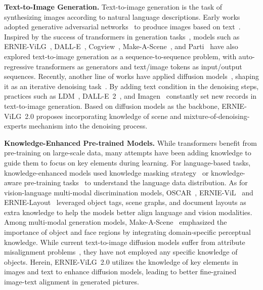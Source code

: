 \documentclass[10pt,twocolumn,letterpaper]{article}
\begin{document}
\noindent\textbf{Text-to-Image Generation.} 
Text-to-image generation is the task of synthesizing images according to natural language descriptions. 
Early works adopted generative adversarial networks~\cite{DBLP:conf/nips/GoodfellowPMXWOCB14} to produce images based on text~\cite{DBLP:conf/cvpr/XuZHZGH018,DBLP:conf/cvpr/ZhuP0019,DBLP:conf/cvpr/Tao00JBX22,DBLP:conf/cvpr/0010KBLY21}.
Inspired by the success of transformers in generation tasks~\cite{DBLP:conf/nips/VaswaniSPUJGKP17}, models such as ERNIE-ViLG~\cite{DBLP:journals/corr/abs-2112-15283}, DALL-E~\cite{DBLP:conf/icml/RameshPGGVRCS21}, Cogview~\cite{DBLP:conf/nips/DingYHZZYLZSYT21}, Make-A-Scene~\cite{DBLP:journals/corr/abs-2203-13131}, and Parti~\cite{DBLP:journals/corr/abs-2206-10789} have also explored text-to-image generation as a sequence-to-sequence problem, with auto-regressive transformers as generators and text/image tokens as input/output sequences.
Recently, another line of works have applied diffusion models~\cite{DBLP:conf/icml/Sohl-DicksteinW15}, shaping it as an iterative denoising task~\cite{DBLP:conf/nips/HoJA20,DBLP:conf/iclr/SongME21,DBLP:conf/iclr/SalimansH22}. 
By adding text condition in the denoising steps, practices such as LDM~\cite{DBLP:journals/corr/abs-2112-10752}, DALL-E~2~\cite{DBLP:journals/corr/abs-2204-06125}, and Imagen~\cite{DBLP:journals/corr/abs-2205-11487} constantly set new records in text-to-image generation.
Based on diffusion models as the backbone, ERNIE-ViLG~2.0 proposes incorporating knowledge of scene and mixture-of-denoising-experts mechanism into the denoising process.


\noindent\textbf{Knowledge-Enhanced Pre-trained Models.}
While transformers benefit from pre-training on large-scale data, many attempts have been adding knowledge to guide them to focus on key elements during learning.
For language-based tasks, knowledge-enhanced models used knowledge masking strategy~\cite{DBLP:journals/corr/abs-1904-09223,DBLP:journals/tacl/JoshiCLWZL20} or knowledge-aware pre-training tasks~\cite{DBLP:conf/aaai/SunWLFTWW20,DBLP:journals/corr/abs-2107-02137} to understand the language data distribution.
As for vision-language multi-modal discrimination models,
OSCAR~\cite{DBLP:conf/eccv/Li0LZHZWH0WCG20}, ERNIE-ViL~\cite{DBLP:conf/aaai/0010TYSTW021} and ERNIE-Layout~\cite{DBLP:journals/corr/abs-2210-06155} leveraged object tags, scene graphs, and document layouts as extra knowledge to help the models better align language and vision modalities.
Among multi-modal generation models, Make-A-Scene~\cite{DBLP:journals/corr/abs-2203-13131} emphasized the importance of object and face regions by integrating domain-specific perceptual knowledge.
While current text-to-image diffusion models suffer from attribute misalignment problems~\cite{DBLP:journals/corr/abs-2204-06125}, they have not employed any specific knowledge of objects.
Herein, ERNIE-ViLG~2.0 utilizes the knowledge of key elements in images and text to enhance diffusion models, leading to better fine-grained image-text alignment in generated pictures.
\end{document}
